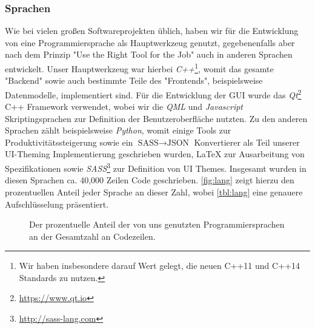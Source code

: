 
\subsubsection{Sprachen}
\label{team:orga-workflow-lang}

Wie bei vielen großen Softwareprojekten üblich, haben wir für die Entwicklung
von \erasim{} eine Programmiersprache als Hauptwerkzeug genutzt, gegebenenfalls
aber nach dem Prinzip "Use the Right Tool for the Job" auch in anderen
Sprachen entwickelt. Unser Hauptwerkzeug war hierbei \emph{C++}\footnote{Wir
haben insbesondere darauf Wert gelegt, die neuen C++11 und C++14 Standards zu
nutzen.}, womit das gesamte "Backend" sowie auch bestimmte Teile des
"Frontends", beispielsweise Datenmodelle, implementiert sind. Für die
Entwicklung der GUI wurde das \emph{Qt}\footnote{\url{https://www.qt.io}} C++
Framework verwendet, wobei wir die \emph{QML} und \emph{Javascript}
Skriptingsprachen zur Definition der Benutzeroberfläche nutzten. Zu den anderen
Sprachen zählt beispielsweise \emph{Python}, womit einige Tools zur
Produktivitätssteigerung sowie ein $\text{SASS} \rightarrow \text{JSON}$
Konvertierer als Teil unserer UI-Theming Implementierung geschrieben wurden,
\LaTeX{} zur Ausarbeitung von Spezifikationen sowie
\emph{SASS}\footnote{\url{http://sass-lang.com}} zur Definition von UI Themes.
Insgesamt wurden in diesen Sprachen ca. 40,000 Zeilen Code geschrieben. \autoref{fig:lang} zeigt hierzu den prozentuellen Anteil jeder Sprache an dieser
Zahl, wobei \autoref{tbl:lang} eine genauere Aufschlüsselung präsentiert.

\begin{figure}[t!]
  \centering
  \caption{Der prozentuelle Anteil der von uns genutzten Programmiersprachen  an der Gesamtzahl an Codezeilen.}
  \label{fig:lang}
\end{figure}


